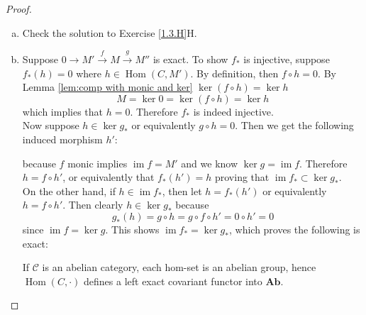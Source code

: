 \documentclass{article}
\newcommand{\fC}{\mathscr{C}}
\DeclareMathOperator{\im}{im}
\DeclareMathOperator{\Hom}{Hom}
\newcommand{\Ab}{\mathbf{Ab}} %
\begin{document}
\begin{proof}
\begin{enumerate}[(a)]
\[        \]
        To show $L$ is right exact, suppose
        \[
        M'\xrightarrow{f}M \xrightarrow{g}M'' \rightarrow 0
        \]
        is exact. By the second argument in the proof that $L$ is left exact, we get that $M'\rightarrow M\rightarrow M''$ is exact. The last thing to show is that $Lg$ is surjective given $g$ is. To do this, fix any $\frac{m''}{s}\in S^{-1}M''$. Because $m''\in M''$ and $g$ is surjective, there exists some $m\in M$ such that $g(m)=m''$. Therefore
    \[
    Lg(\frac{m}{s})=\frac{g(m)}{s}=\frac{m''}{s}
    \]
    which shows $L$ is right exact.
    \item 
    Check the solution to Exercise \ref{1.3.H}H.
    \item 
    Suppose $0\rightarrow M' \xrightarrow{f}M\xrightarrow{g}M''$ is exact. To show $f_*$ is injective, suppose $f_*(h)=0$ where $h\in \Hom(C,M')$. By definition, then $f\circ h=0$. By Lemma \ref{lem:comp with monic and ker} $\ker(f\circ h)=\ker h$
    \[
    M=\ker 0=\ker (f\circ h)=\ker h
    \]
    which implies that $h=0$. Therefore $f_*$ is indeed injective.\\
    Now suppose $h\in \ker g_*$ or equivalently $g\circ h=0$. Then we get the following induced morphism $h'$:
    \begin{center}
    \end{center}
    because $f$ monic implies $\im f=M'$ and we know $\ker g=\im f$.
    Therefore $h=f\circ h'$, or equivalently that $f_*(h')=h$ proving that $\im f_*\subset \ker g_*$.\\
    On the other hand, if $h\in \im f_*$, then let $h=f_*(h')$ or equivalently $h=f\circ h'$. Then clearly $h\in \ker g_*$ because
    \[
    g_*(h)=g\circ h=g\circ f\circ h'=0\circ h'=0
    \]
    since $\im f=\ker g$. This shows $\im f_*=\ker g_*$, which proves the following is exact:
    \begin{center}
    \end{center}
    If $\fC$ is an abelian category, each hom-set is an abelian group, hence $\Hom(C,\cdot)$ defines a left exact covariant functor into $\Ab$.

\end{enumerate}
\end{proof}
\end{document}

